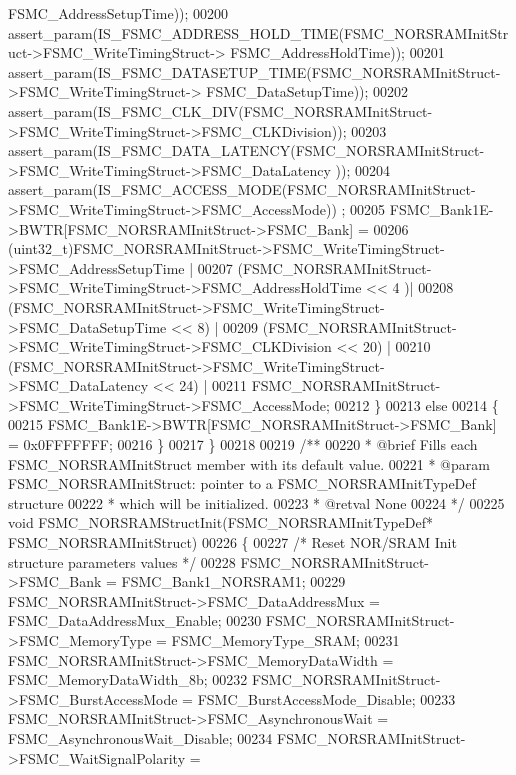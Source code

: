 \begin{DoxyCode}
      FSMC\_AddressSetupTime));
00200     assert_param(IS\_FSMC\_ADDRESS\_HOLD\_TIME(FSMC\_NORSRAMInitStruct->FSMC\_WriteTimingStruct->
      FSMC\_AddressHoldTime));
00201     assert_param(IS\_FSMC\_DATASETUP\_TIME(FSMC\_NORSRAMInitStruct->FSMC\_WriteTimingStruct->
      FSMC\_DataSetupTime));
00202     assert_param(IS\_FSMC\_CLK\_DIV(FSMC\_NORSRAMInitStruct->FSMC\_WriteTimingStruct->FSMC\_CLKDivision));
00203     assert_param(IS\_FSMC\_DATA\_LATENCY(FSMC\_NORSRAMInitStruct->FSMC\_WriteTimingStruct->FSMC\_DataLatency
      ));
00204     assert_param(IS\_FSMC\_ACCESS\_MODE(FSMC\_NORSRAMInitStruct->FSMC\_WriteTimingStruct->FSMC\_AccessMode))
      ;
00205     FSMC_Bank1E->BWTR[FSMC\_NORSRAMInitStruct->FSMC\_Bank] =
00206               (uint32\_t)FSMC\_NORSRAMInitStruct->FSMC\_WriteTimingStruct->FSMC\_AddressSetupTime |
00207               (FSMC\_NORSRAMInitStruct->FSMC\_WriteTimingStruct->FSMC\_AddressHoldTime << 4 )|
00208               (FSMC\_NORSRAMInitStruct->FSMC\_WriteTimingStruct->FSMC\_DataSetupTime << 8) |
00209               (FSMC\_NORSRAMInitStruct->FSMC\_WriteTimingStruct->FSMC\_CLKDivision << 20) |
00210               (FSMC\_NORSRAMInitStruct->FSMC\_WriteTimingStruct->FSMC\_DataLatency << 24) |
00211                FSMC\_NORSRAMInitStruct->FSMC\_WriteTimingStruct->FSMC\_AccessMode;
00212   \}
00213   \textcolor{keywordflow}{else}
00214   \{
00215     FSMC_Bank1E->BWTR[FSMC\_NORSRAMInitStruct->FSMC\_Bank] = 0x0FFFFFFF;
00216   \}
00217 \}
00218 
00219 \textcolor{comment}{/**}
00220 \textcolor{comment}{  * @brief  Fills each FSMC\_NORSRAMInitStruct member with its default value.}
00221 \textcolor{comment}{  * @param  FSMC\_NORSRAMInitStruct: pointer to a FSMC\_NORSRAMInitTypeDef structure }
00222 \textcolor{comment}{  *         which will be initialized.}
00223 \textcolor{comment}{  * @retval None}
00224 \textcolor{comment}{  */}
00225 \textcolor{keywordtype}{void} FSMC_NORSRAMStructInit(FSMC\_NORSRAMInitTypeDef* FSMC\_NORSRAMInitStruct)
00226 \{
00227   \textcolor{comment}{/* Reset NOR/SRAM Init structure parameters values */}
00228   FSMC\_NORSRAMInitStruct->FSMC_Bank = FSMC_Bank1_NORSRAM1;
00229   FSMC\_NORSRAMInitStruct->FSMC_DataAddressMux = FSMC_DataAddressMux_Enable;
00230   FSMC\_NORSRAMInitStruct->FSMC_MemoryType = FSMC_MemoryType_SRAM;
00231   FSMC\_NORSRAMInitStruct->FSMC_MemoryDataWidth = FSMC_MemoryDataWidth_8b;
00232   FSMC\_NORSRAMInitStruct->FSMC_BurstAccessMode = 
      FSMC_BurstAccessMode_Disable;
00233   FSMC\_NORSRAMInitStruct->FSMC_AsynchronousWait = 
      FSMC_AsynchronousWait_Disable;
00234   FSMC\_NORSRAMInitStruct->FSMC_WaitSignalPolarity = 

\end{DoxyCode}

